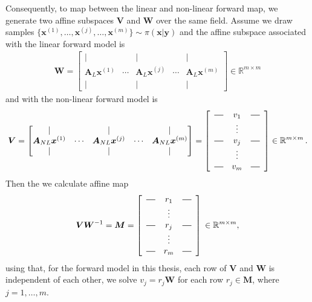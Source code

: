 Consequently, to map between the linear and non-linear forward map, we generate two affine subspaces $\bm{V}$ and $\bm{W}$ over the same field.
Assume we draw samples $\{\bm{x}^{(1)}, \dots, \bm{x}^{(j)}, \dots ,\bm{x}^{(m)}\} \sim \pi(\bm{x}|\bm{y})$ and the affine subspace associated with the linear forward model is \begin{align}
	\bm{W} = \begin{bmatrix}
		\vert&   &  \vert & & \vert \\
		\bm{A}_{L} \bm{x}^{(1)} &  \cdots& \bm{A}_{L} \bm{x}^{(j)} &  \cdots & \bm{A}_{L} \bm{x}^{(m)} \\
		\vert&   &  \vert & & \vert 
	\end{bmatrix}
\in \mathbb{R}^{m \times m}
\end{align} and with the non-linear forward model is 
\begin{align}
	\bm{V} = \begin{bmatrix}
		\vert&   &  \vert & & \vert \\
		\bm{A}_{NL}\bm{x}^{(1)} &  \cdots& \bm{A}_{NL}\bm{x}^{(j)} &  \cdots & \bm{A}_{NL} \bm{x}^{(m)}  \\
		\vert&   &  \vert & & \vert 
	\end{bmatrix} = 
		\begin{bmatrix}
	\begin{array}{ccc}
		\horzbar & v_{1} & \horzbar \\
		& \vdots    &          \\
		\horzbar & v_{j} & \horzbar \\
		& \vdots    &          \\
		\horzbar &v_{m} & \horzbar
	\end{array}
\end{bmatrix}\in \mathbb{R}^{m \times m} \, .
\end{align}
Then the we calculate affine map 
\begin{align}
	\bm{V}\bm{W}^{-1} = \bm{M} =
		\begin{bmatrix}
	\begin{array}{ccc}
		\horzbar & r_{1} & \horzbar \\
		& \vdots    &          \\
		\horzbar & r_{j} & \horzbar \\
		& \vdots    &          \\
		\horzbar &r_{m} & \horzbar
	\end{array}
\end{bmatrix}\, \in \mathbb{R}^{m \times m} ,
\end{align}
using that, for the forward model in this thesis, each row of $\bm{V}$ and $\bm{W}$ is independent of each other, we solve $v_j =r_j \bm{W} $ for each row $ r_j  \in \bm{M}$, where $j = 1, \dots, m$.


